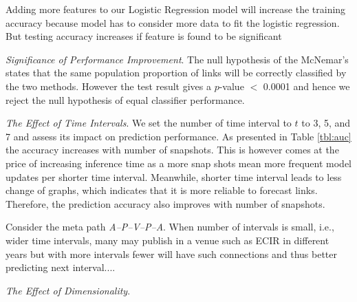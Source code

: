 Adding more features to our Logistic Regression model will increase the training accuracy because model has to consider more data to fit the logistic regression. But testing accuracy increases if feature is found to be significant


\textit{Significance of Performance Improvement}. The null hypothesis of the McNemar's states that the same population proportion of links will be correctly classified by the two methods. However the test result gives a $p$-value $<$ 0.0001 and hence we reject the null hypothesis of equal classifier performance.



%    
%    
%
    
    


\textit{The Effect of Time Intervals}. We set the number of time interval to $t$ to 3, 5, and 7 and assess its impact on prediction performance. As presented in Table \ref{tbl:auc} the accuracy increases with number of snapshots. This is however comes at the price of increasing inference time as a more snap shots mean more frequent model updates per shorter time interval. Meanwhile, shorter time interval leads to less change of graphs, which indicates that it is more reliable to forecast links. Therefore, the prediction accuracy also improves with number of snapshots.

Consider the meta path \textit{A--P--V--P--A}. When number of intervals is small, i.e., wider time intervals, many may publish in a venue such as ECIR in different years but with more intervals fewer will have such connections and thus better predicting next interval....



\textit{The Effect of Dimensionality}.

